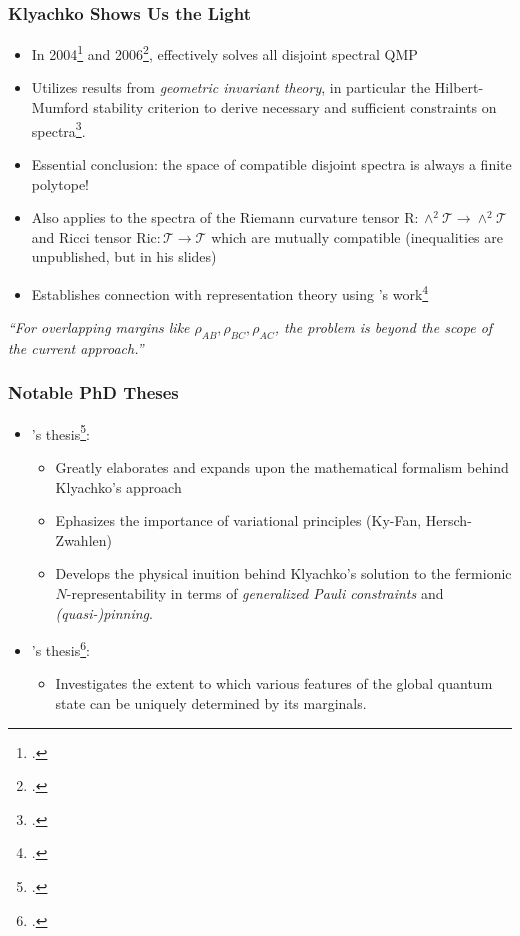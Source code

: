 \documentclass[
    9pt,
    hyperref={bookmarks=false, colorlinks=false}, %
    xcolor={dvipsnames},
]{beamer}
\begin{document}
\begin{frame}
    \frametitle{Klyachko Shows Us the Light}
    \begin{itemize}
        \item In 2004\footcite{klyachko2004quantum} and 2006\footcite{klyachko2006quantum}, \citeauthor{klyachko2006quantum} effectively solves all disjoint spectral QMP
        \item Utilizes results from \textit{geometric invariant theory}, in particular the Hilbert-Mumford stability criterion to derive necessary and sufficient constraints on spectra\footcite{ressayre2010geometric}.
        \item Essential conclusion: the space of compatible disjoint spectra is always a finite polytope!
        \item Also applies to the spectra of the Riemann curvature tensor $\mathrm{R} : \wedge^2 \mathcal T \to \wedge^2 \mathcal T$ and Ricci tensor $\mathrm{Ric} : \mathcal T \to \mathcal T$ which are mutually compatible (inequalities are unpublished, but in his slides)
        \item Establishes connection with representation theory using \citeauthor{berenstein2000coadjoint}'s work\footcite{berenstein2000coadjoint}
    \end{itemize}
    \begin{alertblock}{}
        \textit{``For overlapping margins like $\rho_{AB}, \rho_{BC}, \rho_{AC}$, the problem is beyond the scope of the current approach.''}
        \hspace*{}
    \end{alertblock}
\end{frame}

\begin{frame}
    \frametitle{Notable PhD Theses}
    \begin{itemize}
        \item \citeauthor{schilling2015quantum}'s thesis\footcite{schilling2015quantum}: 
            \begin{itemize}
                \item Greatly elaborates and expands upon the mathematical formalism behind Klyachko's approach
                \item Ephasizes the importance of variational principles (Ky-Fan, Hersch-Zwahlen)
                \item Develops the physical inuition behind Klyachko's solution to the fermionic $N$-representability in terms of \textit{generalized Pauli constraints} and \textit{(quasi-)pinning}.
            \end{itemize}
        \item \citeauthor{klassen2017existence}'s thesis\footcite{klassen2017existence}:
            \begin{itemize}
                \item Investigates the extent to which various features of the global quantum state can be uniquely determined by its marginals.
            \end{itemize}
    \end{itemize}
\end{frame}
\end{document}
